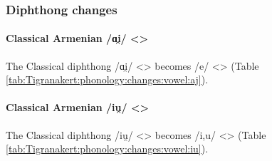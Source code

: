 \subsubsection{Diphthong changes}
\paragraph{Classical Armenian /ɑi̯/ <>}

The Classical diphthong /ɑi̯/ <> becomes /e/ <> (Table \ref{tab:Tigranakert:phonology:changes:vowel:aj}). 



\begin{table}[H]
	\centering 
	\caption{Change from Classical Armenian /ɑi̯/ <> to /e/ <> in the Tigranakert dialect}
	\label{tab:Tigranakert:phonology:changes:vowel:aj}
\end{table}

\paragraph{Classical Armenian /iu̯/ <>}

The Classical diphthong /iu̯/ <> becomes /i,u/ <> (Table \ref{tab:Tigranakert:phonology:changes:vowel:iu}). 



